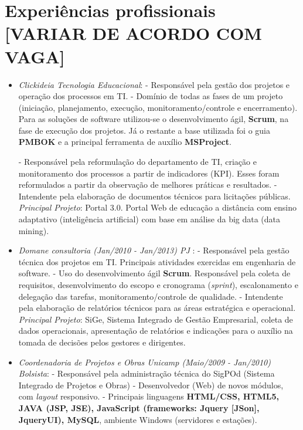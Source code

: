 \documentclass[a4paper,10pt]{article}
\begin{document}
\section{Experiências profissionais [VARIAR DE ACORDO COM VAGA]}
\begin{itemize}

\item \emph{Clickideia Tecnologia Educacional}: 
  \subitem - Responsável pela gestão dos projetos e operação dos processos em TI.
  \subitem - Domínio de todas as fases de um projeto (iniciação, planejamento, execução, monitoramento/controle e encerramento). Para as soluções de software utilizou-se o desenvolvimento ágil, \textbf{Scrum}, na fase de execução dos projetos. Já o restante a base utilizada foi o guia \textbf{PMBOK} e a principal ferramenta de auxílio \textbf{MSProject}.

  \subitem - Responsável pela reformulação do departamento de TI, criação e monitoramento dos processos a partir de indicadores (KPI). Esses foram reformulados a partir da observação de melhores práticas e resultados.
  \subitem - Intendente pela elaboração de documentos técnicos para licitações públicas.
  \subitem \emph{Principal Projeto}: Portal 3.0. Portal Web de educação a distância com ensino adaptativo (inteligência artificial) com base em análise da big data (data mining).

\item \emph{Domane consultoria (Jan/2010 - Jan/2013) PJ }: 
  \subitem - Responsável pela gestão técnica dos projetos em TI. Principais atividades exercidas em engenharia de software.
  \subitem - Uso do desenvolvimento ágil \textbf{Scrum}. Responsável pela coleta de requisitos, desenvolvimento do escopo e cronograma (\textit{sprint}), escalonamento e delegação das tarefas, monitoramento/controle de qualidade.
  \subitem - Intendente pela elaboração de relatórios técnicos para as áreas estratégica e operacional.
  \subitem \emph{Principal Projeto}:  SiGe, Sistema Integrado de Gestão Empresarial, coleta de dados operacionais, apresentação de relatórios e indicações para o auxílio na tomada de decisões pelos gestores e dirigentes.

\item \emph{Coordenadoria de Projetos e Obras Unicamp (Maio/2009 - Jan/2010) Bolsista}: 
  \subitem - Responsável pela administração técnica do SigPOd (Sistema Integrado de Projetos e Obras)
  \subitem - Desenvolvedor (Web) de novos módulos, com \textit{layout} responsivo.
  \subitem - Principais linguagens \textbf{HTML/CSS, HTML5, JAVA (JSP, JSE), JavaScript (frameworks: Jquery [JSon], JqueryUI), MySQL}, ambiente Windows (servidores e estações).
  

\end{itemize}
\end{document}
